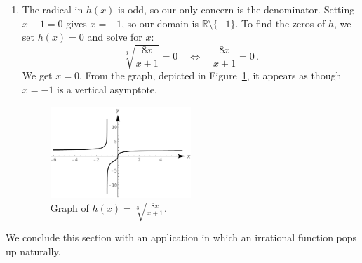 \begin{example}
\begin{enumerate}
\ifvc
\item  The radical in $h(x)$ is odd, so our only concern is the denominator.  Setting $x+1=0$ gives $x=-1$, so our domain is $\mathbb{R}\setminus\{-1\}$.  To find the zeros of $h$, we set $h(x) = 0$ and solve for $x$:
$$
\sqrt[3]{\frac{8x}{x+1}} = 0\quad\Leftrightarrow\quad\frac{8x}{x+1} = 0\,.
$$
  We get $x=0$. From the graph, depicted in Figure~\ref{fig_algebraic_17}, it appears as though $x=-1$ is a vertical asymptote.
\begin{figure}[H]
    \begin{center}
			\includegraphics[width=0.5\textwidth]{fig_algebraic_17}
	\end{center}
    \caption{Graph of $h(x) = \sqrt[3]{\frac{8x}{x+1}}$.}
    \label{fig_algebraic_17}
\end{figure}
\fi 

\end{enumerate}
\end{example}
\fi



\ifcourse
We conclude this section with an application in which an irrational function pops up naturally. 

